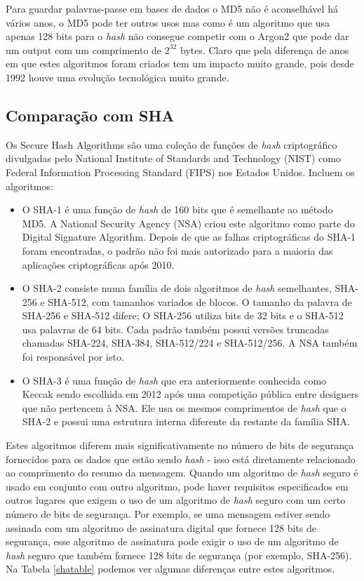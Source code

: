\documentclass[conference]{IEEEtran}
\begin{document}
Para guardar palavras-passe em bases de dados o MD5 não é aconselhável há vários anos, o MD5 pode 
ter outros usos mas como é um algoritmo que usa apenas 128 bits para o \textit{hash} não consegue 
competir com o Argon2 que pode dar um output com um comprimento de $2^{32}$ bytes. Claro que 
pela diferença de anos em que estes algoritmos foram criados tem um impacto muito grande, pois 
desde 1992 houve uma evolução tecnológica muito grande.

\subsection{Comparação com SHA}

Os Secure Hash Algorithms são uma coleção de funções de \textit{hash} criptográfico divulgadas pelo 
National Institute of Standards and Technology (NIST) como Federal Information Processing 
Standard (FIPS) nos Estados Unidos. Incluem os algoritmos: 

\begin{itemize}
\item O SHA-1 é uma função de \textit{hash} de 160 bits que é semelhante ao método MD5. A National Security Agency 
(NSA) criou este algoritmo como parte do Digital Signature Algorithm. Depois de que as falhas 
criptográficas do SHA-1 foram encontradas, o padrão não foi mais autorizado para a maioria das 
aplicações criptográficas após 2010.
\item O SHA-2 consiste numa família de dois algoritmos de \textit{hash} semelhantes, SHA-256 e SHA-512, com tamanhos 
variados de blocos. O tamanho da palavra de SHA-256 e SHA-512 difere; O SHA-256 utiliza bits de 
32 bits e o SHA-512 usa palavras de 64 bits. Cada padrão também possui versões truncadas chamadas 
SHA-224, SHA-384, SHA-512/224 e SHA-512/256. A NSA também foi responsável por isto.
\item O SHA-3 é uma função de \textit{hash} que era anteriormente conhecida como Keccak sendo escolhida 
em 2012 após uma competição pública entre designers que não pertencem à NSA. Ele usa os mesmos 
comprimentos de \textit{hash} que o SHA-2 e possui uma estrutura interna diferente da restante da família SHA.
\end{itemize} \cite{SHA2022}

Estes algoritmos diferem mais significativamente no número de bits de segurança fornecidos para os dados 
que estão sendo \textit{hash} - isso está diretamente relacionado ao comprimento do resumo da mensagem. Quando um 
algoritmo de \textit{hash} seguro é usado em conjunto com outro algoritmo, pode haver requisitos especificados 
em outros lugares que exigem o uso de um algoritmo de \textit{hash} seguro com um certo número de bits de segurança. 
Por exemplo, se uma mensagem estiver sendo assinada com um algoritmo de assinatura digital que fornece 
128 bits de segurança, esse algoritmo de assinatura pode exigir o uso de um algoritmo de \textit{hash} seguro que 
também fornece 128 bits de segurança (por exemplo, SHA-256).
Na Tabela \ref{shatable} podemos ver algumas diferenças entre estes algoritmos.
\end{document}
